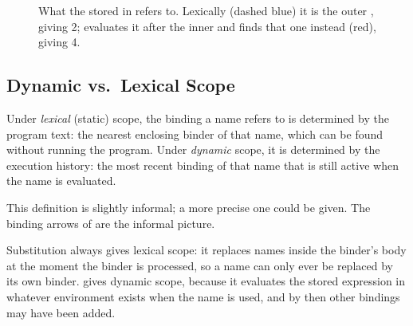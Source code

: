 \begin{figure}[htbp]
\centering
{}
\caption{What the  stored in  refers to. Lexically (dashed blue) it is the outer , giving 2;  evaluates it after the inner  and finds that one instead (red), giving 4.}
\label{fig:dyn}
\end{figure}

\subsection{Dynamic vs.\ Lexical Scope}

\begin{definition}
Under \emph{lexical} (static) scope, the binding a name refers to is determined by the program text: the nearest enclosing binder of that name, which can be found without running the program. Under \emph{dynamic} scope, it is determined by the execution history: the most recent binding of that name that is still active when the name is evaluated.
\end{definition}
This definition is slightly informal; a more precise one could be given. The binding arrows of  are the informal picture.

Substitution always gives lexical scope: it replaces names inside the binder's body at the moment the binder is processed, so a name can only ever be replaced by its own binder.  gives dynamic scope, because it evaluates the stored expression in whatever environment exists when the name is used, and by then other bindings may have been added.


